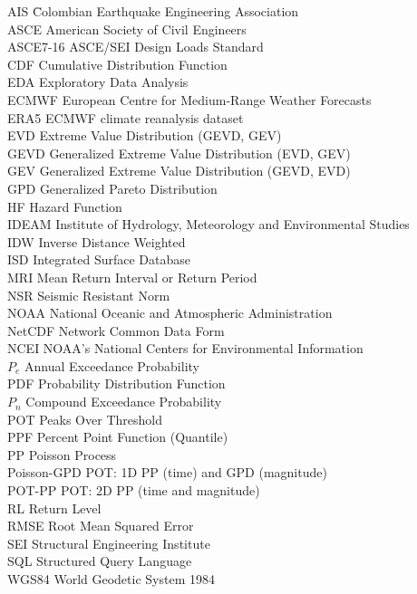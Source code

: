\documentclass[12pt,oneside]{reedthesis}
\begin{document}
  \begin{dedication}
    \begin{tabbing}
    AIS \hspace{4em} \= Colombian Earthquake Engineering Association  \\
    ASCE \> American Society of Civil Engineers \\
    ASCE7-16 \> ASCE/SEI Design Loads Standard \\
    CDF \>  Cumulative Distribution Function \\
    EDA \>  Exploratory Data Analysis \\
    ECMWF \>  European Centre for Medium-Range Weather Forecasts \\
    ERA5 \>  ECMWF climate reanalysis dataset  \\
    EVD \>  Extreme Value Distribution (GEVD, GEV)  \\
    GEVD \>  Generalized Extreme Value Distribution (EVD, GEV) \\
    GEV \>  Generalized Extreme Value Distribution (GEVD, EVD)  \\
    GPD \>  Generalized Pareto Distribution  \\
    HF \> Hazard Function \\
    IDEAM \> Institute of Hydrology, Meteorology and Environmental Studies \\
    IDW \>  Inverse Distance Weighted \\
    ISD \> Integrated Surface Database \\
    MRI \> Mean Return Interval or Return Period \\
    NSR \> Seismic Resistant Norm  \\
    NOAA \> National Oceanic and Atmospheric Administration \\
    NetCDF \> Network Common Data Form \\
    NCEI \> NOAA's National Centers for Environmental Information \\
    $P_e$ \> Annual Exceedance Probability \\
    PDF \> Probability Distribution Function  \\
    $P_n$ \>  Compound Exceedance Probability \\
    POT \> Peaks Over Threshold \\
    PPF \> Percent Point Function (Quantile) \\
    PP \> Poisson Process \\
    Poisson-GPD \> POT: 1D PP (time) and GPD (magnitude) \\
    POT-PP  \> POT: 2D PP (time and magnitude) \\
    RL \> Return Level \\
    RMSE \> Root Mean Squared Error \\  
    SEI \> Structural Engineering Institute \\
    SQL \>  Structured Query Language \\
    WGS84 \> World Geodetic System 1984
    \end{tabbing}
  \end{dedication}
\mainmatter %
\pagestyle{fancyplain} %
\end{document}
